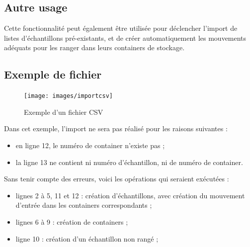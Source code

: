 \subsection{Autre usage}
Cette fonctionnalité peut également être utilisée pour déclencher l'import de listes d'échantillons pré-existants, et de créer automatiquement les mouvements adéquats pour les ranger dans leurs containers de stockage.

\subsection{Exemple de fichier}
\begin{figure}[H]
\texttt{[image: images/importcsv]}
\caption{Exemple d'un fichier CSV}
\end{figure}

Dans cet exemple, l'import ne sera pas réalisé pour les raisons suivantes :
\begin{itemize}
\item en ligne 12, le numéro de container n'existe pas ;
\item la ligne 13 ne contient ni numéro d'échantillon, ni de numéro de container.
\end{itemize}

Sans tenir compte des erreurs, voici les opérations qui seraient exécutées :
\begin{itemize}
\item lignes 2 à 5, 11 et 12 : création d'échantillons, avec création du mouvement d'entrée dans les containers correspondants ;
\item lignes 6 à 9 : création de containers ;
\item ligne 10 : création d'un échantillon non rangé ;
\end{itemize}
